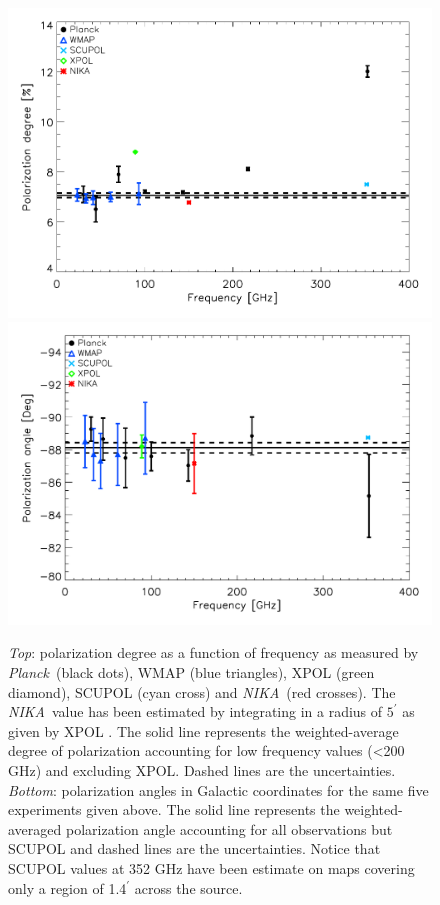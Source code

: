 \documentclass[twocolumn,traditabstract]{aa}
\def\NIKA{\textit{NIKA}}
\def\Planck{\textit{Planck}}
\begin{document}
\begin{figure}
  \centering
          { \includegraphics[width=1\linewidth,keepaspectratio]{figures/pdegree_comparison.pdf}}
          { \includegraphics[width=1\linewidth,keepaspectratio]{figures/angle_comparison.pdf}} 
            \caption{{\it Top}: polarization degree as a function of frequency as measured by \Planck\ (black dots), WMAP (blue triangles), XPOL (green diamond), SCUPOL (cyan cross) and \NIKA\ (red crosses). The \NIKA\ value has been estimated by integrating in a radius of $5^{\prime}$ as given by XPOL \citep{aumont2010}. The solid line represents the weighted-average degree of polarization accounting for low frequency values (\textless 200 GHz) and excluding XPOL.
            Dashed lines are the uncertainties.
            {\it Bottom}: polarization angles in Galactic coordinates for the same five experiments given above. The solid line represents the weighted-averaged polarization angle accounting for all observations but SCUPOL and dashed lines are the uncertainties.
Notice that SCUPOL values \citep{scubapol} at 352 GHz have been estimate on maps covering only a region of 1.4$^\prime$ across the source.}
\label{crab_p_angle_comparison}		
  \end{figure}
\end{document}
